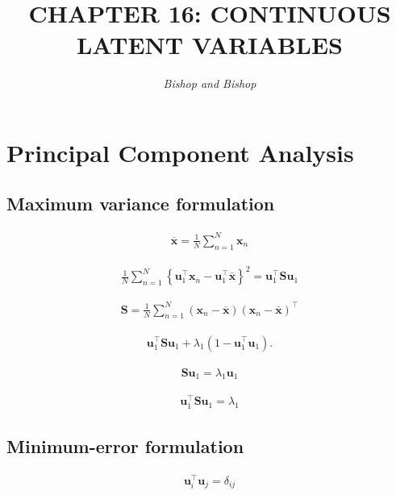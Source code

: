 \documentclass{article}
\title{\LARGE\scshape\MakeUppercase{Chapter 16: Continuous Latent Variables}}
\author{\textit{Bishop and Bishop}}
\date{}
\begin{document}
\maketitle

\section{Principal Component Analysis}

\subsection{Maximum variance formulation}

\begin{align*}
\overline{\mathbf{x}}=\frac{1}{N} \sum_{n=1}^{N} \mathbf{x}_{n} \tag{16.1}
\end{align*}

\begin{align*}
\frac{1}{N} \sum_{n=1}^{N}\left\{\mathbf{u}_{1}^{\top} \mathbf{x}_{n}-\mathbf{u}_{1}^{\top} \overline{\mathbf{x}}\right\}^{2}=\mathbf{u}_{1}^{\top} \mathbf{S} \mathbf{u}_{1} \tag{16.2}
\end{align*}

\begin{align*}
\mathbf{S}=\frac{1}{N} \sum_{n=1}^{N}\left(\mathbf{x}_{n}-\overline{\mathbf{x}}\right)\left(\mathbf{x}_{n}-\overline{\mathbf{x}}\right)^{\top} \tag{16.3}
\end{align*}

\begin{align*}
\mathbf{u}_{1}^{\top} \mathbf{S} \mathbf{u}_{1}+\lambda_{1}\left(1-\mathbf{u}_{1}^{\top} \mathbf{u}_{1}\right) . \tag{16.4}
\end{align*}

\begin{align*}
\mathbf{S} \mathbf{u}_{1}=\lambda_{1} \mathbf{u}_{1} \tag{16.5}
\end{align*}

\begin{align*}
\mathbf{u}_{1}^{\top} \mathbf{S} \mathbf{u}_{1}=\lambda_{1} \tag{16.6}
\end{align*}

\subsection{Minimum-error formulation}

\begin{align*}
\mathbf{u}_{i}^{\top} \mathbf{u}_{j}=\delta_{i j} \tag{16.7}
\end{align*}
\end{document}
